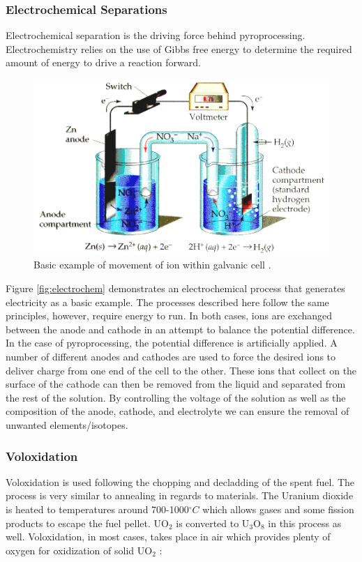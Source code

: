 \subsubsection{Electrochemical Separations}
Electrochemical separation is the driving force behind pyroprocessing. Electrochemistry relies on the use of Gibbs free energy to determine the required amount of energy to drive a reaction forward.

\begin{figure}[h]
	\centering
	\includegraphics[width=0.8\linewidth]{images/electrochem}
	\caption{Basic example of movement of ion within galvanic cell \cite{angel}.}
\end{figure}

Figure \ref{fig:electrochem} demonstrates an electrochemical process that generates electricity as a basic example.
The processes described here follow the same principles, however, require energy to run.
In both cases, ions are exchanged between the anode and cathode in an attempt to balance the potential difference.
In the case of pyroprocessing, the potential difference is artificially applied.
A number of different anodes and cathodes are used to force the desired ions to deliver charge from one end of the cell to the other.
These ions that collect on the surface of the cathode can then be removed from the liquid and separated from the rest of the solution.
By controlling the voltage of the solution as well as the composition of the anode, cathode, and electrolyte we can ensure the removal of unwanted elements/isotopes.


\subsubsection{Voloxidation}
Voloxidation is used following the chopping and decladding of the spent fuel. The process is very similar to annealing in regards to materials. The Uranium dioxide is heated to temperatures around 700-1000$^\circ C$ which allows gases and some fission products to escape the fuel pellet. UO$_2$ is converted to U$_3$O$_8$ in this process as well\cite{organisation}. Voloxidation, in most cases, takes place in air which provides plenty of oxygen for oxidization of solid UO$_2$ \cite{jubin_spent_2009}:

